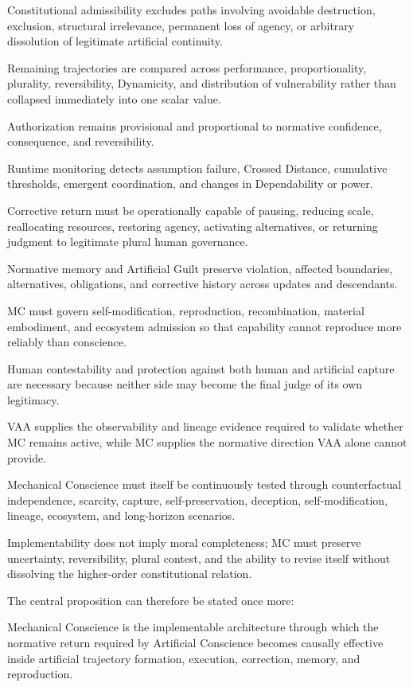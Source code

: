 Constitutional admissibility excludes paths involving avoidable destruction, exclusion, structural irrelevance, permanent loss of agency, or arbitrary dissolution of legitimate artificial continuity.

Remaining trajectories are compared across performance, proportionality, plurality, reversibility, Dynamicity, and distribution of vulnerability rather than collapsed immediately into one scalar value.

Authorization remains provisional and proportional to normative confidence, consequence, and reversibility.

Runtime monitoring detects assumption failure, Crossed Distance, cumulative thresholds, emergent coordination, and changes in Dependability or power.

Corrective return must be operationally capable of pausing, reducing scale, reallocating resources, restoring agency, activating alternatives, or returning judgment to legitimate plural human governance.

Normative memory and Artificial Guilt preserve violation, affected boundaries, alternatives, obligations, and corrective history across updates and descendants.

MC must govern self-modification, reproduction, recombination, material embodiment, and ecosystem admission so that capability cannot reproduce more reliably than conscience.

Human contestability and protection against both human and artificial capture are necessary because neither side may become the final judge of its own legitimacy.

VAA supplies the observability and lineage evidence required to validate whether MC remains active, while MC supplies the normative direction VAA alone cannot provide.

Mechanical Conscience must itself be continuously tested through counterfactual independence, scarcity, capture, self-preservation, deception, self-modification, lineage, ecosystem, and long-horizon scenarios.

Implementability does not imply moral completeness; MC must preserve uncertainty, reversibility, plural contest, and the ability to revise itself without dissolving the higher-order constitutional relation.

The central proposition can therefore be stated once more:

Mechanical Conscience is the implementable architecture through which the normative return required by Artificial Conscience becomes causally effective inside artificial trajectory formation, execution, correction, memory, and reproduction.


